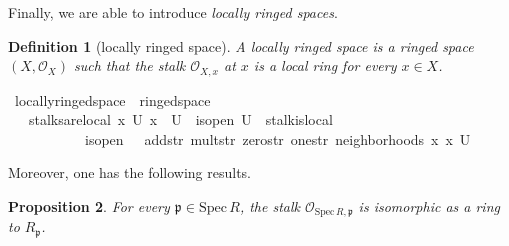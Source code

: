 \documentclass[12pt]{scrartcl}
\newtheorem{proposition}{Proposition}[section]
\newtheorem{definition}[proposition]{Definition}
\def\spec{\text{Spec}\,R}
\begin{document}
Finally, we are able to introduce \emph{locally ringed spaces}.

\begin{definition}[locally ringed space]
	A locally ringed space is a ringed space $(X, \mathscr{O}_X)$ such that the stalk $\mathscr{O}_{X, x}$ at $x$ is a local ring for every $x \in X$.
\end{definition}

\begin{isabelle}
\isamarkupfalse%
\ locally{\isacharunderscore}{\kern0pt}ringed{\isacharunderscore}{\kern0pt}space\ {\isacharequal}{\kern0pt}\ ringed{\isacharunderscore}{\kern0pt}space\ {\isacharplus}{\kern0pt}\isanewline
\ \ \ stalks{\isacharunderscore}{\kern0pt}are{\isacharunderscore}{\kern0pt}local{\isacharcolon}{\kern0pt}\ {\isachardoublequoteopen}{\isasymAnd}x\ U{\isachardot}{\kern0pt}\ x\ {\isasymin}\ U\ {\isasymLongrightarrow}\ is{\isacharunderscore}{\kern0pt}open\ U\ {\isasymLongrightarrow}\ stalk{\isachardot}{\kern0pt}is{\isacharunderscore}{\kern0pt}local\ \isanewline
\ \ \ \ \ \ \ \ \ \ \ is{\isacharunderscore}{\kern0pt}open\ {\isasymFF}\ {\isasymrho}\ add{\isacharunderscore}{\kern0pt}str\ mult{\isacharunderscore}{\kern0pt}str\ zero{\isacharunderscore}{\kern0pt}str\ one{\isacharunderscore}{\kern0pt}str\ {\isacharparenleft}{\kern0pt}neighborhoods\ x{\isacharparenright}{\kern0pt}\ x\ U{\isachardoublequoteclose}
\end{isabelle}

Moreover, one has the following results.

\begin{proposition}
	\label{prop:keyprop}
	For every $\mathfrak{p} \in \text{Spec}\,R$, the stalk $\mathscr{O}_{\spec, \mathfrak{p}}$ is isomorphic as a ring to $R_{\mathfrak{p}}$.	
\end{proposition}	
\end{document}
